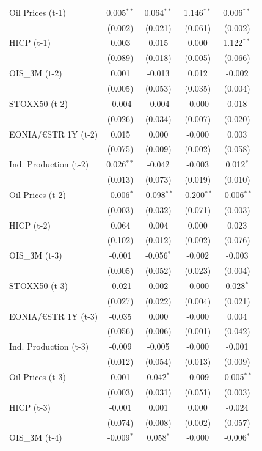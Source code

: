 \begin{longtable}[t]{lcccc}
Oil Prices (t-1) & 0.005$^{**}$ & 0.064$^{**}$ & 1.146$^{**}$ & 0.006$^{**}$\\
 & (0.002) & (0.021) & (0.061) & (0.002)\\
HICP (t-1) & 0.003 & 0.015 & 0.000 & 1.122$^{**}$\\
 & (0.089) & (0.018) & (0.005) & (0.066)\\
OIS\_3M (t-2) & 0.001 & -0.013 & 0.012 & -0.002\\
 & (0.005) & (0.053) & (0.035) & (0.004)\\
STOXX50 (t-2) & -0.004 & -0.004 & -0.000 & 0.018\\
 & (0.026) & (0.034) & (0.007) & (0.020)\\
EONIA/€STR 1Y (t-2) & 0.015 & 0.000 & -0.000 & 0.003\\
 & (0.075) & (0.009) & (0.002) & (0.058)\\
Ind. Production (t-2) & 0.026$^{**}$ & -0.042 & -0.003 & 0.012$^{*}$\\
 & (0.013) & (0.073) & (0.019) & (0.010)\\
Oil Prices (t-2) & -0.006$^{*}$ & -0.098$^{**}$ & -0.200$^{**}$ & -0.006$^{**}$\\
 & (0.003) & (0.032) & (0.071) & (0.003)\\
HICP (t-2) & 0.064 & 0.004 & 0.000 & 0.023\\
 & (0.102) & (0.012) & (0.002) & (0.076)\\
OIS\_3M (t-3) & -0.001 & -0.056$^{*}$ & -0.002 & -0.003\\
 & (0.005) & (0.052) & (0.023) & (0.004)\\
STOXX50 (t-3) & -0.021 & 0.002 & -0.000 & 0.028$^{*}$\\
 & (0.027) & (0.022) & (0.004) & (0.021)\\
EONIA/€STR 1Y (t-3) & -0.035 & 0.000 & -0.000 & 0.004\\
 & (0.056) & (0.006) & (0.001) & (0.042)\\
Ind. Production (t-3) & -0.009 & -0.005 & -0.000 & -0.001\\
 & (0.012) & (0.054) & (0.013) & (0.009)\\
Oil Prices (t-3) & 0.001 & 0.042$^{*}$ & -0.009 & -0.005$^{**}$\\
 & (0.003) & (0.031) & (0.051) & (0.003)\\
HICP (t-3) & -0.001 & 0.001 & 0.000 & -0.024\\
 & (0.074) & (0.008) & (0.002) & (0.057)\\
OIS\_3M (t-4) & -0.009$^{*}$ & 0.058$^{*}$ & -0.000 & -0.006$^{*}$\\

\end{longtable}

